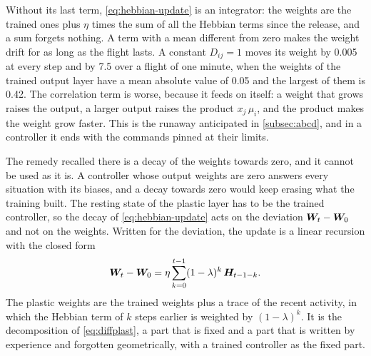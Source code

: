 Without its last term, \eqref{eq:hebbian-update} is an integrator: the weights are the trained ones plus $\eta$ times the sum of all the Hebbian terms since the release, and a sum forgets nothing. A term with a mean different from zero makes the weight drift for as long as the flight lasts. A constant $D_{ij} = 1$ moves its weight by 0.005 at every step and by 7.5 over a flight of one minute, when the weights of the trained output layer have a mean absolute value of 0.05 and the largest of them is 0.42. The correlation term is worse, because it feeds on itself: a weight that grows raises the output, a larger output raises the product $x_j\, \mu_i$, and the product makes the weight grow faster. This is the runaway anticipated in \autoref{subsec:abcd}, and in a controller it ends with the commands pinned at their limits.

The remedy recalled there is a decay of the weights towards zero, and it cannot be used as it is. A controller whose output weights are zero answers every situation with its biases, and a decay towards zero would keep erasing what the training built. The resting state of the plastic layer has to be the trained controller, so the decay of \eqref{eq:hebbian-update} acts on the deviation $\bm{W}_t - \bm{W}_0$ and not on the weights. Written for the deviation, the update is a linear recursion with the closed form
\begin{equation}
\bm{W}_t - \bm{W}_0 = \eta \sum_{k=0}^{t-1} (1-\lambda)^{k}\, \bm{H}_{t-1-k}.
\label{eq:hebbian-trace}
\end{equation}
The plastic weights are the trained weights plus a trace of the recent activity, in which the Hebbian term of $k$ steps earlier is weighted by $(1-\lambda)^{k}$. It is the decomposition of \eqref{eq:diffplast}, a part that is fixed and a part that is written by experience and forgotten geometrically, with a trained controller as the fixed part.

